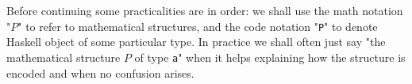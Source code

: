 \documentclass[12pt,a4paper]{article}
\begin{document}
Before continuing some practicalities are in order: we shall use the math notation "$P$" to refer to mathematical structures, and the code notation "\texttt{P}" to denote Haskell object of some particular type. In practice we shall often just say "the mathematical structure $P$ of type \texttt{a}" when it helps explaining how the structure is encoded and when no confusion arises.              
\end{document}
